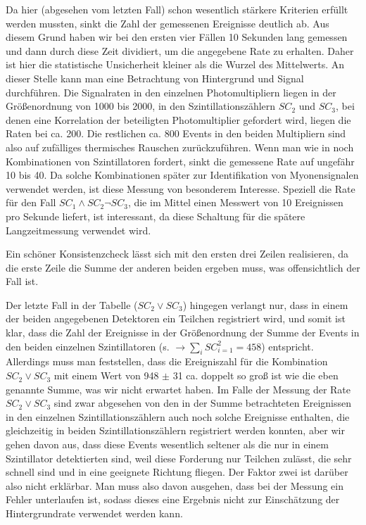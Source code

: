 Da hier (abgesehen vom letzten Fall) schon wesentlich stärkere Kriterien erfüllt
werden mussten, sinkt die Zahl der gemessenen Ereignisse deutlich ab. Aus
diesem Grund haben wir bei den ersten vier Fällen 10 Sekunden lang gemessen
und dann durch diese Zeit dividiert, um die angegebene Rate zu erhalten. Daher
ist hier die statistische Unsicherheit kleiner als die Wurzel des Mittelwerts.
An dieser Stelle kann man eine Betrachtung von Hintergrund und Signal
durchführen. Die Signalraten in den einzelnen Photomultipliern liegen in der
Größenordnung von 1000 bis 2000, in den Szintillationszählern $SC_2$ und
$SC_3$, bei denen eine Korrelation der beteiligten Photomultiplier gefordert
wird, liegen die Raten bei ca. 200. Die restlichen ca. 800 Events in den beiden
Multipliern sind also auf zufälliges thermisches Rauschen zurückzuführen. Wenn
man wie in  noch Kombinationen von Szintillatoren
fordert, sinkt die gemessene Rate auf ungefähr 10 bis 40. Da solche
Kombinationen später zur Identifikation von Myonensignalen verwendet werden,
ist diese Messung von besonderem Interesse. Speziell die Rate für den Fall $SC_1
\wedge SC_2 \neg SC_3$, die im Mittel einen Messwert von 10 Ereignissen pro
Sekunde liefert, ist interessant, da diese Schaltung für die spätere
Langzeitmessung verwendet wird. 

Ein schöner Konsistenzcheck lässt sich mit den ersten drei Zeilen realisieren,
da die erste Zeile die Summe der anderen beiden ergeben muss, was
offensichtlich der Fall ist.

Der letzte Fall in der Tabelle ($SC_2 \vee SC_3$) hingegen verlangt nur, dass in
einem der
beiden angegebenen Detektoren ein Teilchen registriert wird, und somit ist
klar, dass die Zahl der Ereignisse in der Größenordnung der Summe der Events in
den beiden einzelnen Szintillatoren (s. 
$\rightarrow \sum_i SC_{i=1}^2 = 458 $) entspricht. Allerdings muss man
feststellen, 
dass die Ereigniszahl für die Kombination $SC_2 \vee SC_3$ mit einem Wert von
948 $\pm$ 31 ca. doppelt so groß ist wie die eben genannte Summe, was wir nicht
erwartet haben. Im Falle der Messung der Rate $SC_2 \vee SC_3$ sind zwar
abgesehen von den in der Summe betrachteten Ereignissen in den einzelnen
Szintillationszählern auch noch solche Ereignisse enthalten, die gleichzeitig
in beiden Szintillationszählern registriert werden konnten, aber wir gehen
davon aus, dass diese Events wesentlich seltener als die nur in einem
Szintillator detektierten sind, weil diese Forderung nur Teilchen zulässt, die
sehr schnell sind und in eine geeignete Richtung fliegen. Der Faktor zwei ist
darüber also nicht erklärbar. Man muss also davon ausgehen, dass bei der
Messung ein Fehler unterlaufen ist, sodass dieses eine Ergebnis nicht zur
Einschätzung der Hintergrundrate verwendet werden kann.

